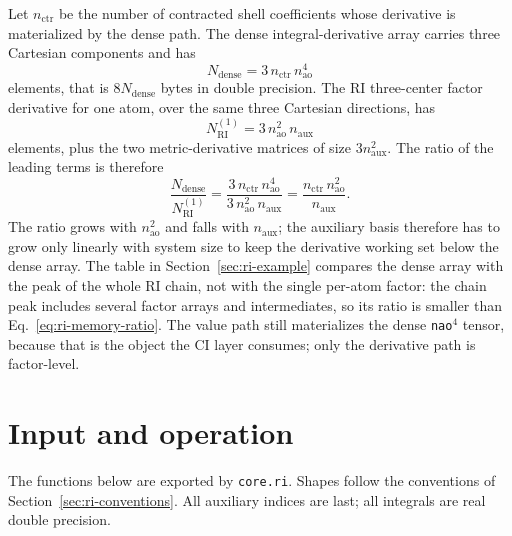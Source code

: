 Let $n_{\mathrm{ctr}}$ be the number of contracted shell coefficients
whose derivative is materialized by the dense path.  The dense
integral-derivative array carries three Cartesian components and has
\begin{equation}
  N_{\mathrm{dense}} = 3\,n_{\mathrm{ctr}}\,n_{\mathrm{ao}}^{4}
  \label{eq:ri-dense-elements}
\end{equation}
elements, that is $8N_{\mathrm{dense}}$ bytes in double precision.  The
RI three-center factor derivative for one atom, over the same three
Cartesian directions, has
\begin{equation}
  N_{\mathrm{RI}}^{(1)}
  = 3\,n_{\mathrm{ao}}^{2}\,n_{\mathrm{aux}}
  \label{eq:ri-factor-elements}
\end{equation}
elements, plus the two metric-derivative matrices of size
$3n_{\mathrm{aux}}^{2}$.  The ratio of the leading terms is therefore
\begin{equation}
  \frac{N_{\mathrm{dense}}}{N_{\mathrm{RI}}^{(1)}}
  = \frac{3\,n_{\mathrm{ctr}}\,n_{\mathrm{ao}}^{4}}
         {3\,n_{\mathrm{ao}}^{2}\,n_{\mathrm{aux}}}
  = \frac{n_{\mathrm{ctr}}\,n_{\mathrm{ao}}^{2}}
         {n_{\mathrm{aux}}}.
  \label{eq:ri-memory-ratio}
\end{equation}
The ratio grows with $n_{\mathrm{ao}}^{2}$ and falls with $n_{\mathrm{aux}}$;
the auxiliary basis therefore has to grow only linearly with system size
to keep the derivative working set below the dense array.  The table in
Section~\ref{sec:ri-example} compares the dense array with the peak of
the whole RI chain, not with the single per-atom factor: the chain peak
includes several factor arrays and intermediates, so its ratio is
smaller than Eq.~\eqref{eq:ri-memory-ratio}.  The value path still
materializes the dense \texttt{nao}$^4$ tensor, because that is the
object the CI layer consumes; only the derivative path is factor-level.

\section{Input and operation}
\label{sec:ri-input}

The functions below are exported by \texttt{core.ri}.  Shapes follow the
conventions of Section~\ref{sec:ri-conventions}.  All auxiliary indices
are last; all integrals are real double precision.

